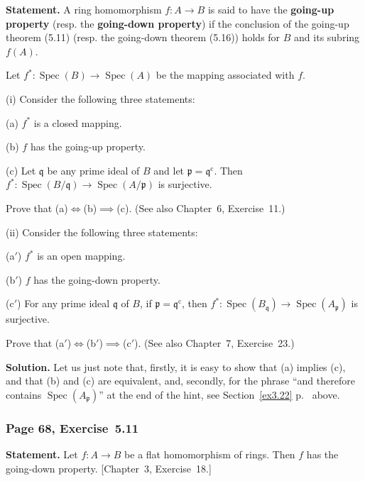 \documentclass[12pt,letterpaper]{article}%
\newcommand{\oo}{\operatorname}\newcommand{\ooo}{\operatorname*}
\newcommand{\mf}{\mathfrak}
\newcommand{\ppp}{\mf p}
\newcommand{\qqq}{\mf q}
\newcommand{\Spec}{\operatorname{Spec}}\newcommand{\Sp}{\operatorname{Spec}}
\newcommand{\nn}{\noindent}
\begin{document}
\textbf{Statement.} A ring homomorphism $f:A\to B$ is said to have the \textbf{going-up property} (resp. the \textbf{going-down property}) if the conclusion of the going-up theorem (5.11) (resp. the going-down theorem (5.16)) holds for $B$ and its subring $f(A)$.

Let $f^*:\Spec(B)\to\Spec(A)$ be the mapping associated with $f$. 

\nn(i) Consider the following three statements:

(a) $f^*$ is a closed mapping.

(b)  $f$ has the going-up property.

(c) Let $\qqq$ be any prime ideal of $B$ and let $\ppp=\qqq^{\oo c}$. Then $f^*:\Spec(B/\qqq)\to\Spec(A/\ppp)$ is surjective.

Prove that (a)$\iff$(b)$\implies$(c). (See also Chapter~6, Exercise~11.)

\nn(ii) Consider the following three statements:

(a$'$) $f^*$ is an open mapping.

(b$'$) $f$ has the going-down property.

(c$'$) For any prime ideal $\qqq$ of $B$, if $\ppp=\qqq^{\oo c}$, then $f^*:\Spec(B_\qqq)\to\Spec(A_\ppp)$ is surjective.

Prove that (a$'$)$\iff$(b$'$)$\implies$(c$'$). (See also Chapter~7, Exercise~23.)

\nn[To prove that (a$'$)$\iff$(c$'$), observe that $B_\qqq$ is the direct limit of the rings $B_t$ where $t\in B\setminus\qqq$; hence, by Chapter~3, Exercise~26, we have 
$$
f^*(\Spec(B_\qqq))=\bigcap_tf^*(\Spec(B_t))=\bigcap_tf^*(Y_t).
$$ 
Since $Y_t$ is an open neighborhood of $\qqq$ in $Y$, and since $f^*$ is open, it follows that $f^*(Y_t)$ is an open neighborhood of $\ppp$ in $X$ and therefore contains $\Spec(A_\ppp)$.]

\nn\textbf{Solution.} Let us just note that, firstly, it is easy to show that (a) implies (c), and that (b) and (c) are equivalent, and, secondly, for the phrase ``and therefore contains $\Spec(A_\ppp)$'' at the end of the hint, see Section~\ref{ex3.22} p.~\pageref{ex3.22} above.

\subsubsection{Page 68, Exercise~5.11}\label{ex5.11}%

\textbf{Statement.} Let $f:A\to B$ be a flat homomorphism of rings. Then $f$ has the going-down property. [Chapter~3, Exercise~18.]
\end{document}
